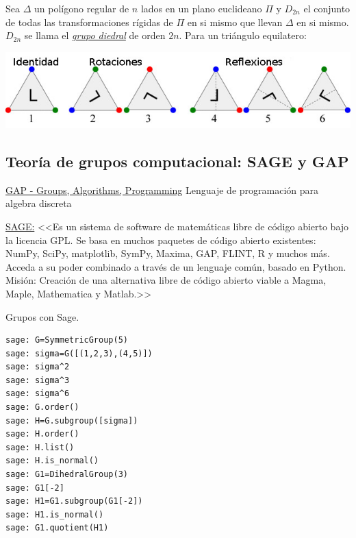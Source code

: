 \begin{ejemplo} Sea $\Delta$ un polígono regular de $n$ lados  en un plano euclideano $\Pi$ y $D_{2n}$ el conjunto de todas las transformaciones rígidas de $\Pi$ en si mismo que llevan $\Delta$ en si mismo. $D_{2n}$ se llama el \href{http://es.wikipedia.org/wiki/Grupo_diedral}{\emph{grupo diedral}}  de orden $2n$. Para un triángulo equilatero:
\begin{center}
\includegraphics[scale=.4]{imagenes/SimTria.jpg}
\end{center}
\end{ejemplo}



\subsection{Teoría de grupos computacional: SAGE y GAP}

\href{http://www.gap-system.org/}{GAP - Groups, Algorithms, Programming} Lenguaje de programación para algebra discreta

\href{http://www.sagemath.org/}{SAGE:}  <<Es un sistema de software de matemáticas libre de código abierto bajo la licencia GPL. Se basa en  muchos paquetes de código abierto existentes: NumPy, SciPy, matplotlib, SymPy, Maxima, GAP, FLINT, R y muchos más. Acceda a su poder combinado a través de un lenguaje común, basado en Python. Misión: Creación de una alternativa libre de código abierto viable a Magma, Maple, Mathematica y Matlab.>>


\begin{ejemplo} Grupos con Sage.
 
\end{ejemplo}

\begin{lstlisting}
sage: G=SymmetricGroup(5)
sage: sigma=G([(1,2,3),(4,5)])
sage: sigma^2
sage: sigma^3
sage: sigma^6
sage: G.order()
sage: H=G.subgroup([sigma])
sage: H.order()
sage: H.list()
sage: H.is_normal()
sage: G1=DihedralGroup(3)
sage: G1[-2]
sage: H1=G1.subgroup(G1[-2])
sage: H1.is_normal()
sage: G1.quotient(H1)
\end{lstlisting}




